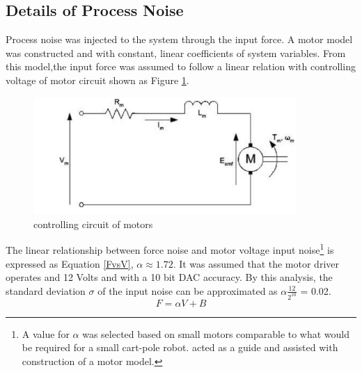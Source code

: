 \documentclass{article}
\begin{document}
\subsection{Details of Process Noise}\label{appendix:processNoise}
Process noise was injected to the system through the input force. A motor model was constructed and with constant, linear coefficients of system variables. From this model,the input force was assumed to follow a linear relation with controlling voltage of motor circuit shown as Figure \ref{fig:circuit}.
\begin{figure}[h!]
	\centering
	\includegraphics[width=10cm,keepaspectratio]{circuit.png}
	\caption{controlling circuit of motors}
	\label{fig:circuit}
\end{figure}
The linear relationship between force noise and motor voltage input noise\footnote{A value for $\alpha$ was selected based on small motors comparable to what would be required for a small cart-pole robot. \cite{lab3} acted as a guide and assisted with construction of a motor model.} is expressed as Equation \ref{FvsV}, $\alpha \approx 1.72$. It was assumed that the motor driver operates and 12 Volts and with a 10 bit DAC accuracy. By this analysis, the standard deviation $\sigma$ of the input noise can be approximated as $\alpha\frac{12}{2^{10}}$ = 0.02.
\begin{equation}
F = \alpha V + B
\label{FvsV}
\end{equation}
\end{document}

